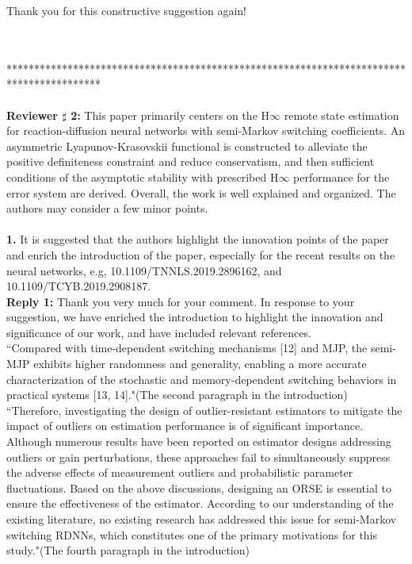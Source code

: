\documentclass[14pt,fleqn]{article}
\begin{document}
Thank you for this constructive suggestion again!

~\\
\\
*****************************************************************************************\\
\\
\hspace*{-0.5cm}\indent\textbf{Reviewer $\sharp$ 2:}  This paper primarily centers on the H$\infty$ remote state estimation for reaction-diffusion neural networks with semi-Markov switching coefficients. An asymmetric Lyapunov-Krasovskii functional is constructed to alleviate the positive definiteness constraint and reduce conservatism, and then sufficient conditions of the asymptotic stability with prescribed H$\infty$ performance for the error system are derived. Overall, the work is well explained and organized. The authors may consider a few minor points.
\\
~\\
\textbf{1.} It is suggested that the authors highlight the innovation points of the paper and enrich the introduction of the paper, especially for the recent results on the neural networks, e.g, 10.1109/TNNLS.2019.2896162, and 10.1109/TCYB.2019.2908187.\\

\indent \textbf{Reply 1:} Thank you very much for your comment. In response to your suggestion, we have enriched the introduction to highlight the innovation and significance of our work, and have included relevant references.\\

``{\color{red}Compared with time-dependent switching mechanisms [12] and MJP, the semi-MJP exhibits higher randomness and generality, enabling a more accurate characterization of the stochastic and memory-dependent switching behaviors in practical systems [13, 14]."}(The second paragraph in the introduction)\\

``{\color{red}Therefore, investigating the design of outlier-resistant estimators to mitigate the impact of outliers on estimation performance is of significant importance. Although numerous results have been reported on estimator designs addressing outliers or gain perturbations, these approaches fail to simultaneously suppress the adverse effects of measurement outliers and probabilistic parameter fluctuations.} Based on the above discussions, designing an ORSE is essential to ensure the effectiveness of the estimator. According to our understanding of the existing literature, no existing research has addressed this issue for semi-Markov switching RDNNs, which constitutes one of the primary motivations for this study."(The fourth paragraph in the introduction)\\
\end{document}

